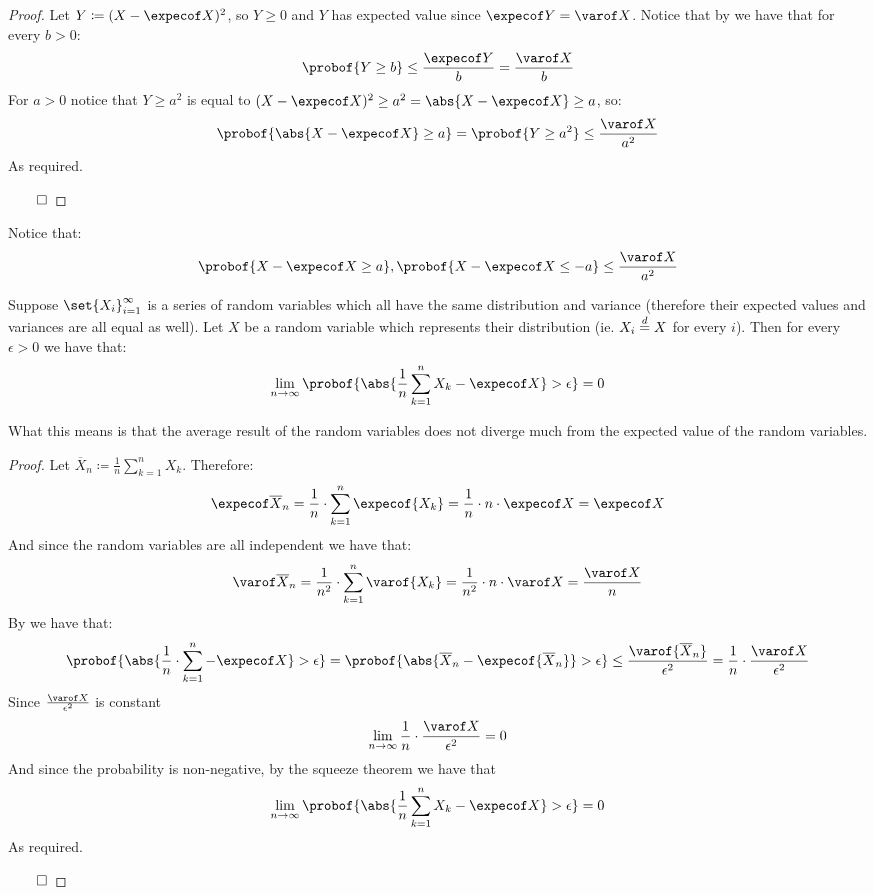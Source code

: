 \begin{proof}

	Let $Y\coloneqq(X-\expecof X)^2$, so $Y\geq0$ and $Y$ has expected value since $\expecof Y=\varof X$.
	Notice that by  we have that for every $b>0$:
	\[ \probof{Y\geq b} \leq \frac{\expecof Y}b = \frac{\varof X}b \]
	For $a>0$ notice that $Y\geq a^2$ is equal to $(X-\expecof X)^2\geq a^2=\abs{X-\expecof X}\geq a$, so:
	\[ \probof{\abs{X-\expecof X}\geq a} = \probof{Y\geq a^2} \leq \frac{\varof X}{a^2} \]
	As required.

	\hfill$\qed$

\end{proof}

Notice that:
\[ \probof{X-\expecof X\geq a}, \probof{X-\expecof X\leq -a} \leq \frac{\varof X}{a^2} \]

\begin{thrm*}

	Suppose $\set{X_i}_{i=1}^\infty$ is a series of random variables which all have the same distribution and variance
	(therefore their expected values and variances are all equal as well).
	Let $X$ be a random variable which represents their distribution (ie. $X_i\mathrel{\overset d=} X$ for every $i$).
	Then for every $\epsilon>0$ we have that:
    \[ \lim_{n\to\infty}\probof{\abs{\frac1n\sum_{k=1}^n X_k - \expecof X}>\epsilon} = 0 \]

\end{thrm*}

What this means is that the average result of the random variables does not diverge much from the expected value of
the random variables.

\begin{proof}

	\def\avgX{\overline X_n}
	Let $\avgX\coloneqq\frac1n\sum\limits_{k=1}^n X_k$.
	Therefore:
	\[ \expecof\avgX = \frac1n\cdot\sum_{k=1}^n\expecof{X_k} = \frac1n\cdot n\cdot\expecof X = \expecof X \]
	And since the random variables are all independent we have that:
	\[ \varof\avgX = \frac1{n^2}\cdot\sum_{k=1}^n\varof{X_k} = \frac1{n^2}\cdot n\cdot\varof X = \frac{\varof X}n \]
	By  we have that:
	\[ \probof{\abs{\frac1n\cdot\sum_{k=1}^n-\expecof X}>\epsilon} = \probof{\abs{\avgX - \expecof{\avgX}}>\epsilon}
	\leq \frac{\varof{\avgX}}{\epsilon^2} = \frac1n\cdot\frac{\varof X}{\epsilon^2} \]
	Since $\frac{\varof X}{\epsilon^2}$ is constant
	\[ \lim_{n\to\infty}\frac1n\cdot\frac{\varof X}{\epsilon^2} = 0 \]
	And since the probability is non-negative, by the squeeze theorem we have that
    \[ \lim_{n\to\infty}\probof{\abs{\frac1n\sum_{k=1}^n X_k - \expecof X}>\epsilon} = 0 \]
	As required.

	\hfill$\qed$

\end{proof}

